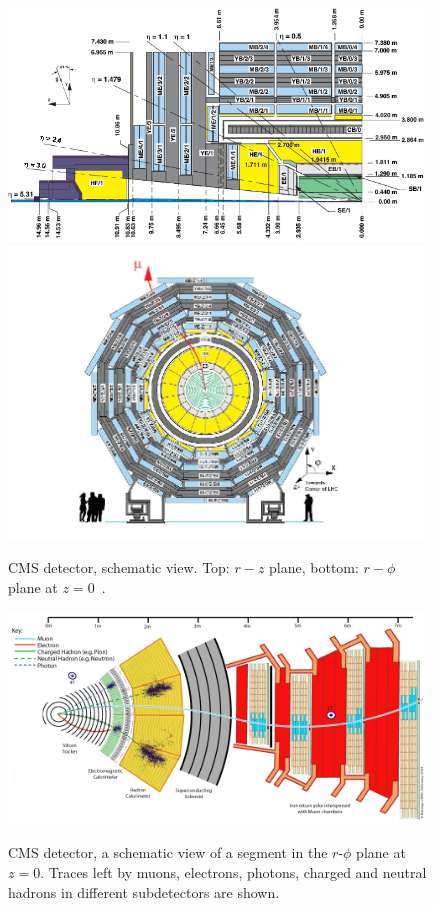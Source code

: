 \begin{figure}[htb]
  \begin{center}
    {\includegraphics[width=0.98\textwidth]{../figs/Exp/CMSview1.png}\\
     \includegraphics[width=0.98\textwidth]{../figs/Exp/CMSview.png}}
    \caption{CMS detector, schematic view. Top: $r-z$ plane, bottom: $r-\phi$ plane at $z=0$~\cite{ref_CMSschemView}. }
    \label{fig:CMSschemView}
  \end{center}
\end{figure}


\begin{figure}[htb]
  \begin{center}
    {\includegraphics[width=0.98\textwidth]{../figs/Exp/CMS_Slice.png}}
    \caption{CMS detector, a schematic view of a segment in the $r$-$\phi$ plane at $z=0$. Traces left by muons, electrons, photons, charged and neutral hadrons in different subdetectors are shown.}
    \label{fig:CMS_slice}
  \end{center}
\end{figure}

